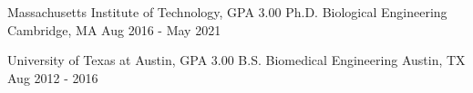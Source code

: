 
\begin{cventries}
  \cventry
    {Massachusetts Institute of Technology, GPA 3.00} %
    {Ph.D. Biological Engineering} %
    {Cambridge, MA} %
    {Aug 2016 - May 2021} %
    {
    }

  \cventry
    {University of Texas at Austin, GPA 3.00} %
    {B.S. Biomedical Engineering} %
    {Austin, TX} %
    {Aug 2012 - 2016} %
    {
    }


\end{cventries}
